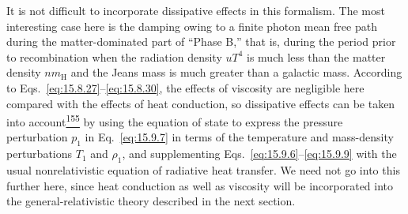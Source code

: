 It is not difficult to incorporate dissipative effects in this formalism. The
most interesting case here is the damping owing to a finite photon mean free
path during the matter-dominated part of ``Phase B,'' that is, during the
period prior to recombination when the radiation density \(uT^4\) is much
less than the matter density \(nm_{\mathrm H}\) and the Jeans mass is much
greater than a galactic mass. According to
Eqs.~\eqref{eq:15.8.27}--\eqref{eq:15.8.30}, the effects of viscosity are
negligible here compared with the effects of heat conduction, so dissipative
effects can be taken into
account\hyperref[ch15-ref-155]{\textsuperscript{155}} by using the equation
of state to express the pressure perturbation \(p_1\) in
Eq.~\eqref{eq:15.9.7} in terms of the temperature and mass-density
perturbations \(T_1\) and \(\rho_1\), and supplementing
Eqs.~\eqref{eq:15.9.6}--\eqref{eq:15.9.9} with the usual nonrelativistic
equation of radiative heat transfer. We need not go into this further here,
since heat conduction as well as viscosity will be incorporated into the
general-relativistic theory described in the next section.
